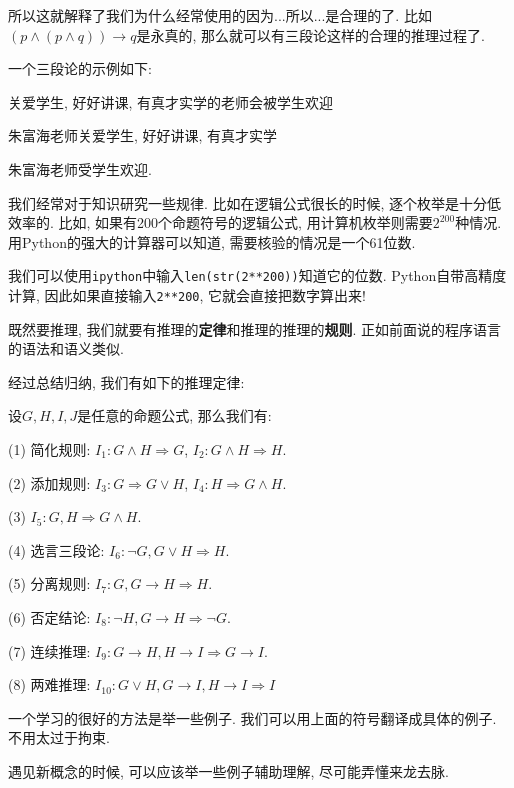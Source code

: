 所以这就解释了我们为什么经常使用的因为...所以...是合理的了. 比如$(p\land(p\land q))\to q$是永真的, 那么就可以有三段论这样的合理的推理过程了. 

\begin{example}
	一个三段论的示例如下: 
	
	关爱学生, 好好讲课, 有真才实学的老师会被学生欢迎
	
	朱富海老师关爱学生, 好好讲课, 有真才实学
	
	朱富海老师受学生欢迎. 
\end{example}

我们经常对于知识研究一些规律. 比如在逻辑公式很长的时候, 逐个枚举是十分低效率的. 比如, 如果有200个命题符号的逻辑公式, 用计算机枚举则需要$2^{200}$种情况. 用Python的强大的计算器可以知道, 需要核验的情况是一个61位数.

\begin{example}
	我们可以使用\texttt{ipython}中输入\texttt{len(str(2**200))}知道它的位数. Python自带高精度计算, 因此如果直接输入\texttt{2**200}, 它就会直接把数字算出来! 
\end{example} 

既然要推理, 我们就要有推理的\textbf{定律}和推理的推理的\textbf{规则}. 正如前面说的程序语言的语法和语义类似. 

经过总结归纳, 我们有如下的推理定律: 

\begin{theorem}[常见的推理定律]
	设$G,H,I,J$是任意的命题公式, 那么我们有: 
	
	(1) 简化规则: $I_1:G\land H\Rightarrow G$, $I_2: G\land H \Rightarrow H$.
	
	(2) 添加规则: $I_3:G\Rightarrow G\lor H$, $I_4: H\Rightarrow G\land H$.
	
	(3) $I_5: G,H\Rightarrow G\land H$.
	
	(4) 选言三段论: $I_6: \lnot G, G\lor H \Rightarrow H$.
	
	(5) 分离规则: $I_7: G,G\to H\Rightarrow H$.
	
	(6) 否定结论: $I_8: \lnot H, G\to H\Rightarrow \lnot G$.
	
	(7) 连续推理: $I_9: G\to H, H\to I\Rightarrow G\to I$.
	
	(8) 两难推理: $I_10: G\lor H,G\to I, H\to I\Rightarrow I$

\end{theorem}

一个学习的很好的方法是举一些例子. 我们可以用上面的符号翻译成具体的例子. 不用太过于拘束.  

\begin{idea}
	遇见新概念的时候, 可以应该举一些例子辅助理解, 尽可能弄懂来龙去脉. 
\end{idea}

